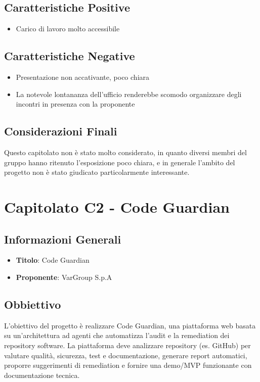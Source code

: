\documentclass[a4paper,12pt]{article}
\begin{document}
    \subsection{Caratteristiche Positive}
    \begin{itemize}
        \item Carico di lavoro molto accessibile 
    \end{itemize}
    \subsection{Caratteristiche Negative}
    \begin{itemize}
        \item Presentazione non accativante, poco chiara
        \item La notevole lontananza dell'ufficio renderebbe scomodo organizzare degli incontri in presenza con la proponente 
    \end{itemize}
    \subsection{Considerazioni Finali}
    Questo capitolato non è stato molto considerato, in quanto diversi membri del gruppo hanno ritenuto l'esposizione poco chiara, e in generale l'ambito del progetto non è stato giudicato particolarmente interessante.

    \section{Capitolato C2 - Code Guardian}
    \subsection{Informazioni Generali}
        \begin{itemize}
            \item \textbf{Titolo}: Code Guardian
            \item \textbf{Proponente}: VarGroup S.p.A
        \end{itemize}
    \subsection{Obbiettivo}
    L’obiettivo del progetto è realizzare Code Guardian, una piattaforma web basata su un’architettura ad agenti che automatizza l’audit e la remediation dei repository software. La piattaforma deve analizzare repository (es. GitHub) per valutare qualità, sicurezza, test e documentazione, generare report automatici, proporre suggerimenti di remediation e fornire una demo/MVP funzionante con documentazione tecnica.
\end{document}
